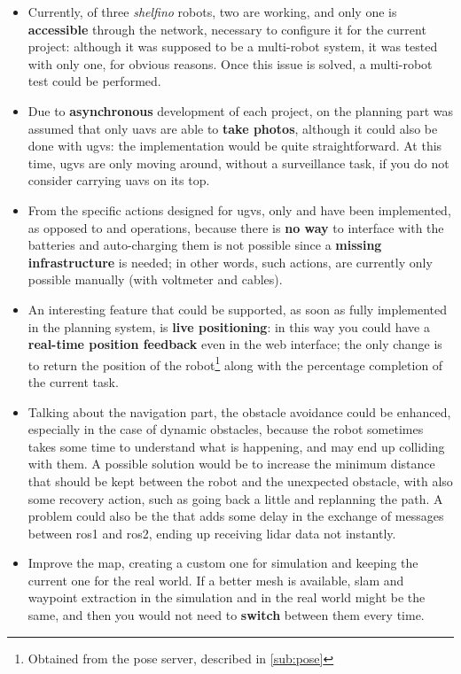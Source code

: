 \begin{itemize}

\item Currently, of three \textit{shelfino} robots, two are working, and only one is \textbf{accessible} through the network, necessary to configure it for the current project: although it was supposed to be a multi-robot system, it was tested with only one, for obvious reasons. Once this issue is solved, a multi-robot test could be performed.

\item Due to \textbf{asynchronous} development of each project, on the planning part was assumed that only \acrshort{uavs} are able to \textbf{take photos}, although it could also be done with \acrshort{ugvs}: the implementation would be quite straightforward. At this time, \acrshort{ugvs} are only moving around, without a surveillance task, if you do not consider carrying \acrshort{uavs} on its top.

\item From the specific actions designed for \acrshort{ugvs}, only  and  have been implemented, as opposed to  and  operations, because there is \textbf{no way} to interface with the batteries and auto-charging them is not possible since a \textbf{missing infrastructure} is needed; in other words, such actions, are currently only possible manually (with voltmeter and cables).

\item An interesting feature that could be supported, as soon as fully implemented in the planning system, is \textbf{live positioning}: in this way you could have a \textbf{real-time position feedback} even in the web interface; the only change is to return the position of the robot\footnote{Obtained from the pose server, described in \autoref{sub:pose}} along with the percentage completion of the current task.

\item Talking about the navigation part, the obstacle avoidance could be enhanced, especially in the case of dynamic obstacles, because the robot sometimes takes some time to understand what is happening, and may end up colliding with them. A possible solution would be to increase the minimum distance that should be kept between the robot and the unexpected obstacle, with also some recovery action, such as going back a little and replanning the path. A problem could also be the  that adds some delay in the exchange of messages between \acrshort{ros}1 and \acrshort{ros}2, ending up receiving lidar data not instantly.

\item Improve the map, creating a custom one for simulation and keeping the current one for the real world. If a better mesh is available, \acrshort{slam} and waypoint extraction in the simulation and in the real world might be the same, and then you would not need to \textbf{switch} between them every time.

\end{itemize}